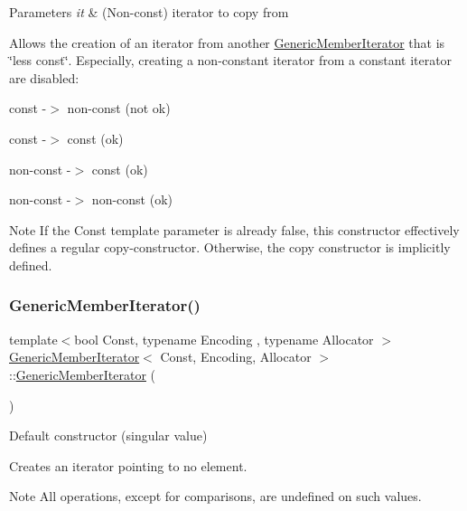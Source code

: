 \begin{DoxyParams}{Parameters}
{\em it} & (Non-\/const) iterator to copy from\\
\hline
\end{DoxyParams}
Allows the creation of an iterator from another \hyperlink{classGenericMemberIterator}{Generic\+Member\+Iterator} that is \char`\"{}less const\char`\"{}. Especially, creating a non-\/constant iterator from a constant iterator are disabled\+: \begin{DoxyItemize}
\item const -\/$>$ non-\/const (not ok) \item const -\/$>$ const (ok) \item non-\/const -\/$>$ const (ok) \item non-\/const -\/$>$ non-\/const (ok)\end{DoxyItemize}
\begin{DoxyNote}{Note}
If the {\ttfamily Const} template parameter is already {\ttfamily false}, this constructor effectively defines a regular copy-\/constructor. Otherwise, the copy constructor is implicitly defined. 
\end{DoxyNote}
\mbox{\label{classGenericMemberIterator_a2708717d497a0aadacdf75900de4c5b4}} 
\subsubsection{\texorpdfstring{Generic\+Member\+Iterator()}{GenericMemberIterator()}\hspace{0.1cm}{\footnotesize\ttfamily [3/4]}}
{\footnotesize\ttfamily template$<$bool Const, typename Encoding , typename Allocator $>$ \\
\hyperlink{classGenericMemberIterator}{Generic\+Member\+Iterator}$<$ Const, Encoding, Allocator $>$\+::\hyperlink{classGenericMemberIterator}{Generic\+Member\+Iterator} (\begin{DoxyParamCaption}{ }\end{DoxyParamCaption})\hspace{0.3cm}{\ttfamily [inline]}}



Default constructor (singular value) 

Creates an iterator pointing to no element. \begin{DoxyNote}{Note}
All operations, except for comparisons, are undefined on such values. 
\end{DoxyNote}
\mbox{\label{classGenericMemberIterator_a2697fd327a90654b0bf91c988e43f95e}} 
